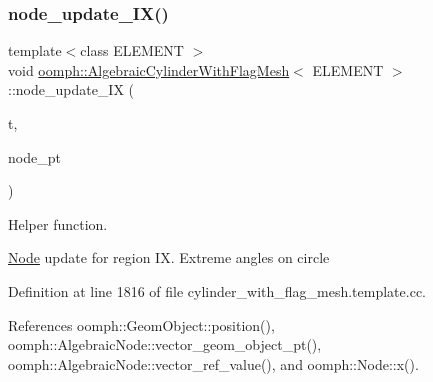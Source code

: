 \mbox{\label{classoomph_1_1AlgebraicCylinderWithFlagMesh_ae8e85400abd282b64463b67e21e9c13a}} 
\subsubsection{\texorpdfstring{node\+\_\+update\+\_\+\+I\+X()}{node\_update\_IX()}}
{\footnotesize\ttfamily template$<$class E\+L\+E\+M\+E\+NT $>$ \\
void \hyperlink{classoomph_1_1AlgebraicCylinderWithFlagMesh}{oomph\+::\+Algebraic\+Cylinder\+With\+Flag\+Mesh}$<$ E\+L\+E\+M\+E\+NT $>$\+::node\+\_\+update\+\_\+\+IX (\begin{DoxyParamCaption}\item[{const unsigned \&}]{t,  }\item[{\hyperlink{classoomph_1_1AlgebraicNode}{Algebraic\+Node} $\ast$\&}]{node\+\_\+pt }\end{DoxyParamCaption})\hspace{0.3cm}{\ttfamily [protected]}}



Helper function. 

\hyperlink{classoomph_1_1Node}{Node} update for region IX. Extreme angles on circle 

Definition at line 1816 of file cylinder\+\_\+with\+\_\+flag\+\_\+mesh.\+template.\+cc.



References oomph\+::\+Geom\+Object\+::position(), oomph\+::\+Algebraic\+Node\+::vector\+\_\+geom\+\_\+object\+\_\+pt(), oomph\+::\+Algebraic\+Node\+::vector\+\_\+ref\+\_\+value(), and oomph\+::\+Node\+::x().

\mbox{\label{classoomph_1_1AlgebraicCylinderWithFlagMesh_a035216f13c9758881ce2b7e33ad27926}} 
